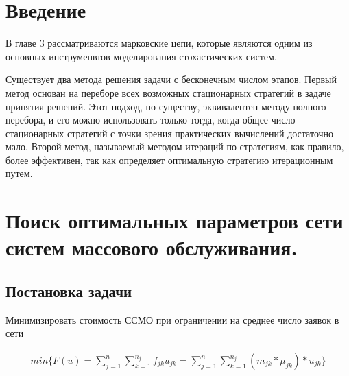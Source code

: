 \documentclass[a4paper, 12pt]{article}		%
\begin{document}

\tableofcontents

%
\newpage
\section*{Введение}

В главе 3 рассматриваются марковские цепи, которые являются одним из основных инструменвтов моделирования стохастических систем. 

Существует два метода решения задачи с бесконечным числом этапов. Первый метод основан на переборе всех возможных стационарных стратегий в задаче при­нятия решений. Этот подход, по существу, эквивалентен методу полного перебора, и его можно использовать только тогда, когда общее число стационарных страте­гий с точки зрения практических вычислений достаточно мало. Второй метод, на­зываемый методом итераций по стратегиям, как правило, более эффективен, так как определяет оптимальную стратегию итерационным путем.







\newpage
\section{Поиск оптимальных параметров сети систем массового обслуживания.}

\subsection{Постановка задачи}
Минимизировать стоимость ССМО при ограничении на среднее число заявок в сети

\begin{gather*}
min\{F(u) = \sum\limits_{j=1}^n \sum\limits_{k=1}^{n_j} f_{jk} u_{jk} = \sum\limits_{j=1}^n \sum\limits_{k=1}^{n_j} (m_{jk} * \mu_{jk}) * u_{jk} \}
\end{gather*} 
\end{document}
